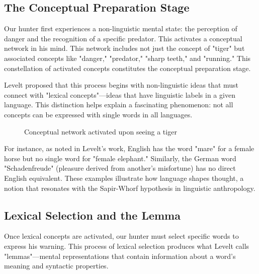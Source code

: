 \documentclass[12pt,a4paper]{article}
\begin{document}
\subsection{The Conceptual Preparation Stage}

Our hunter first experiences a non-linguistic mental state: the perception of danger and the recognition of a specific predator. This activates a conceptual network in his mind. This network includes not just the concept of "tiger" but associated concepts like "danger," "predator," "sharp teeth," and "running." This constellation of activated concepts constitutes the conceptual preparation stage.

Levelt proposed that this process begins with non-linguistic ideas that must connect with "lexical concepts"—ideas that have linguistic labels in a given language. This distinction helps explain a fascinating phenomenon: not all concepts can be expressed with single words in all languages. 

\begin{figure}[h]
\centering
{}
\caption{Conceptual network activated upon seeing a tiger}
\label{fig:concept_network}
\end{figure}

For instance, as noted in Levelt's work, English has the word "mare" for a female horse but no single word for "female elephant." Similarly, the German word "Schadenfreude" (pleasure derived from another's misfortune) has no direct English equivalent. These examples illustrate how language shapes thought, a notion that resonates with the Sapir-Whorf hypothesis in linguistic anthropology.

\subsection{Lexical Selection and the Lemma}

Once lexical concepts are activated, our hunter must select specific words to express his warning. This process of lexical selection produces what Levelt calls "lemmas"—mental representations that contain information about a word's meaning and syntactic properties.
\end{document}
